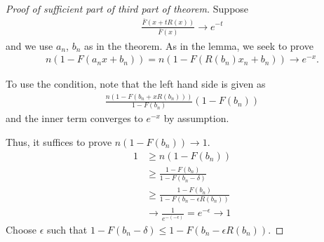 \begin{proof}[Proof of sufficient part of third part of theorem]
  Suppose
  \begin{align}
    \label{eq:130}
    \frac{\overline F(x + t R(x))}{\overline F(x)} \rightarrow e^{-t}
  \end{align} and we use $a_{n}$, $b_{n}$ as in the theorem.  As in
  the lemma, we seek to prove
  \begin{align}
    \label{eq:131}
    n(1 - F(a_{n} x + b_{n})) = n(1 - F(R(b_{n}) x_{n} + b_{n})) \rightarrow e^{-x}.
  \end{align}

  To use the condition, note that the left hand side is given as
  \begin{align}
    \label{eq:132}
    \frac{n(1 - F(b_{n} + x R(b_{n})))}{1 - F(b_{n})} (1 - F(b_{n}))
  \end{align} and the inner term converges to $e^{-x}$ by assumption.

  Thus, it suffices to prove $n(1 - F(b_{n})) \rightarrow 1$.
  \begin{align}
    \label{eq:133}
    1 &\geq n(1 - F(b_{n})) \\
    &\geq \frac{1 - F(b_{n})}{1 - F(b_{n} - \delta)} \\
  &\geq \frac{1 - F(b_{n})}{1 - F(b_{n} - \epsilon R(b_{n}))} \\
  &\rightarrow \frac{1}{e^{-(-\epsilon)}}  = e^{-\epsilon} \rightarrow 1
  \end{align} Choose $\epsilon$ such that $1 - F(b_{n} - \delta) \leq 1
  - F(b_{n} - \epsilon R(b_{n}))$.
\end{proof}


